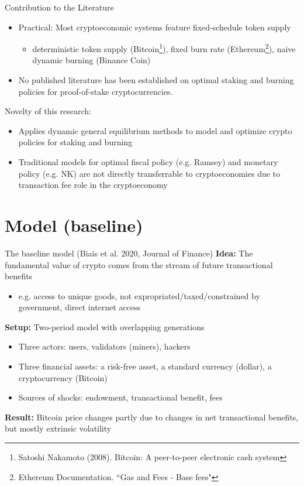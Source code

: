 \documentclass{beamer}
\begin{document}
\begin{frame}{Contribution to the Literature}
\begin{itemize}
    \item Practical: Most cryptoeconomic systems feature fixed-schedule token supply
    \begin{itemize}
        \item deterministic token supply (Bitcoin\footnote{Satoshi Nakamoto (2008). Bitcoin: A peer-to-peer electronic cash system}), 
        fixed burn rate (Ethereum\footnote{Ethereum Documentation. ``Gas and Fees - Base fees"}), 
        naive dynamic burning (Binance Coin)
    \end{itemize}

    \item No published literature has been established on optimal staking and burning policies for proof-of-stake cryptocurrencies.
\end{itemize}
Novelty of this research:
\begin{itemize}
    \item Applies dynamic general equilibrium methods to model and optimize crypto policies for staking and burning            
      \item Traditional models for optimal fiscal policy (e.g. Ramsey) and monetary policy (e.g. NK) are not directly transferrable to cryptoeconomies due to transaction fee role in the cryptoeconomy
  
\end{itemize}
\end{frame}





\section{Model (baseline)}
\begin{frame}{The baseline model (Biais et al. 2020, Journal of Finance)}
\textbf{Idea:} The fundamental value of crypto comes from the stream of future transactional benefits \parencite{tirole1985asset}\\
\begin{itemize}
    \item e.g. access to unique goods, not expropriated/taxed/constrained by government, direct internet access
\end{itemize}
\textbf{Setup:} Two-period model with overlapping generations
\begin{itemize}
    \item Three actors: users, validators (miners), hackers
    \item Three financial assets: a risk-free asset, a standard currency (dollar), a cryptocurrency (Bitcoin)
    \item Sources of shocks: endowment, transactional benefit, fees
\end{itemize}
\textbf{Result:} Bitcoin price changes partly due to changes in net transactional benefits, but mostly extrinsic volatility
\end{frame}
\end{document}
